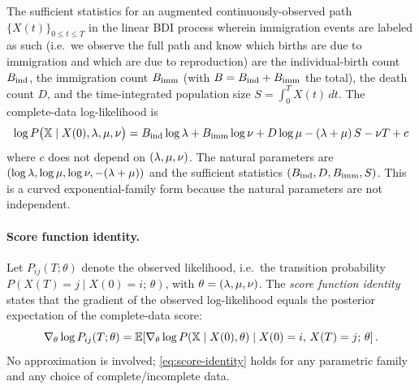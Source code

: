 The sufficient statistics for an augmented continuously-observed path $\{X(t)\}_{0 \leq t \leq T}$ in the linear BDI process
wherein immigration events are labeled as such (i.e.\ we observe the full path and know which births are due to
immigration and which are due to reproduction)
are the individual-birth count $B_{\mathrm{ind}}$, the immigration count $B_{\mathrm{imm}}$
(with $B = B_{\mathrm{ind}} + B_{\mathrm{imm}}$ the total), the death count $D$, and the
time-integrated population size $S = \int_0^T X(t)\,dt$.
The complete-data log-likelihood is
\begin{equation}\label{eq:bdi-complete}
\log P\bigl(\mathbb{X} \mid X(0),\lambda,\mu,\nu\bigr)
  = B_{\mathrm{ind}} \log\lambda + B_{\mathrm{imm}} \log\nu + D\log\mu
    - (\lambda+\mu)\,S - \nu T + c
\end{equation}
where $c$ does not depend on $(\lambda,\mu,\nu)$.
The natural parameters are
$(\log\lambda, \log\mu, \log\nu, -(\lambda+\mu))$ and the sufficient statistics
$(B_{\mathrm{ind}}, D, B_{\mathrm{imm}}, S)$.
This is a curved exponential-family form because the natural parameters are not independent.


\paragraph{Score function identity.}
Let $P_{ij}(T;\theta)$ denote the observed likelihood, i.e.\ the transition
probability $P(X(T)=j \mid X(0)=i;\,\theta)$, with $\theta = (\lambda,\mu,\nu)$.
The \emph{score function identity} states that the gradient of the
observed log-likelihood equals the posterior expectation of the complete-data score:
\begin{equation}\label{eq:score-identity}
\nabla_\theta \log P_{ij}(T;\theta)
  = \mathbb{E}\!\left[\nabla_\theta \log P(\mathbb{X}\mid X(0),\theta)
      \;\middle|\; X(0)=i,\, X(T)=j;\,\theta\right].
\end{equation}
No approximation is involved; \eqref{eq:score-identity} holds for any parametric
family and any choice of complete/incomplete data.


